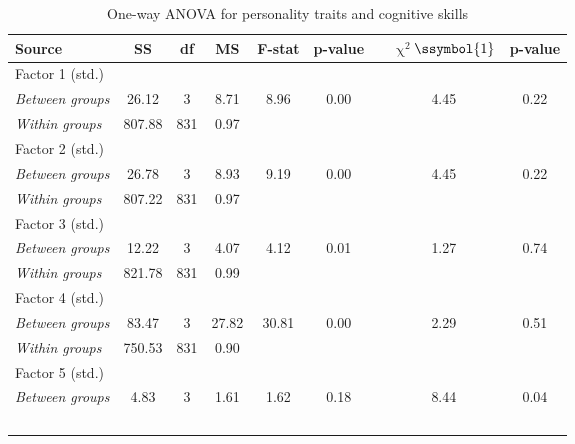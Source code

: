 \begin{table}[htbp]
  \raggedright
  \caption{One-way ANOVA for personality traits and cognitive skills}
    \begin{tabular}{lcccccccc}
    \toprule
    Source & SS & df & MS & F-stat & p-value &       & $\upchi^2$$\ssymbol{1}$  & p-value \\
    \midrule
    Factor 1 (std.) &       &       &       &       &       &       &       &  \\
    \hspace*{0.1cm} \textit{Between groups} & 26.12 & 3     & 8.71  & 8.96  & 0.00  &       & 4.45  & 0.22 \\
    \hspace*{0.1cm} \textit{Within groups} & 807.88 & 831   & 0.97  &       &       &       &       &  \\
    Factor 2 (std.) &       &       &       &       &       &       &       &  \\
    \hspace*{0.1cm} \textit{Between groups} & 26.78 & 3     & 8.93  & 9.19  & 0.00  &       & 4.45  & 0.22 \\
    \hspace*{0.1cm} \textit{Within groups} & 807.22 & 831   & 0.97  &       &       &       &       &  \\
    Factor 3 (std.) &       &       &       &       &       &       &       &  \\
    \hspace*{0.1cm} \textit{Between groups} & 12.22 & 3     & 4.07  & 4.12  & 0.01  &       & 1.27  & 0.74 \\
    \hspace*{0.1cm} \textit{Within groups} & 821.78 & 831   & 0.99  &       &       &       &       &  \\
    Factor 4 (std.) &       &       &       &       &       &       &       &  \\
    \hspace*{0.1cm} \textit{Between groups} & 83.47 & 3     & 27.82 & 30.81 & 0.00  &       & 2.29  & 0.51 \\
    \hspace*{0.1cm} \textit{Within groups} & 750.53 & 831   & 0.90  &       &       &       &       &  \\
    Factor 5 (std.) &       &       &       &       &       &       &       &  \\
    \hspace*{0.1cm} \textit{Between groups} & 4.83  & 3     & 1.61  & 1.62  & 0.18  &       & 8.44  & 0.04 \\
$$
\end{tabular}
\end{table}
